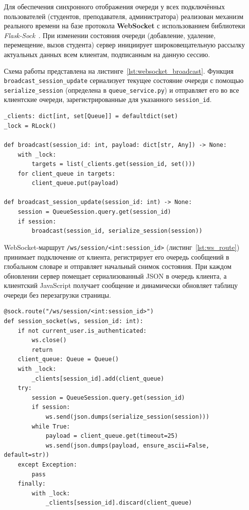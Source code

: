 Для обеспечения синхронного отображения очереди у всех подключённых пользователей (студентов, преподавателя, администратора) реализован механизм реального времени на базе протокола \textbf{WebSocket} с использованием библиотеки \textit{Flask-Sock}~\cite{flask_docs}. При изменении состояния очереди (добавление, удаление, перемещение, вызов студента) сервер инициирует широковещательную рассылку актуальных данных всем клиентам, подписанным на данную сессию.

Схема работы представлена на листинге~\ref{lst:websocket_broadcast}. Функция \texttt{broadcast\_session\_update} сериализует текущее состояние очереди с помощью \texttt{serialize\_session} (определена в \texttt{queue\_service.py}) и отправляет его во все клиентские очереди, зарегистрированные для указанного \texttt{session\_id}.

\begin{lstlisting}[caption={Широковещательная рассылка обновлений (realtime.py)}, label={lst:websocket_broadcast}]
_clients: dict[int, set[Queue]] = defaultdict(set)
_lock = RLock()

def broadcast(session_id: int, payload: dict[str, Any]) -> None:
    with _lock:
        targets = list(_clients.get(session_id, set()))
    for client_queue in targets:
        client_queue.put(payload)

def broadcast_session_update(session_id: int) -> None:
    session = QueueSession.query.get(session_id)
    if session:
        broadcast(session_id, serialize_session(session))
\end{lstlisting}

WebSocket-маршрут \texttt{/ws/session/<int:session\_id>} (листинг~\ref{lst:ws_route}) принимает подключение от клиента, регистрирует его очередь сообщений в глобальном словаре и отправляет начальный снимок состояния. При каждом обновлении сервер помещает сериализованный JSON в очередь клиента, а клиентский JavaScript получает сообщение и динамически обновляет таблицу очереди без перезагрузки страницы.

\begin{lstlisting}[caption={Обработчик WebSocket-соединения (realtime.py)}, label={lst:ws_route}]
@sock.route("/ws/session/<int:session_id>")
def session_socket(ws, session_id: int):
    if not current_user.is_authenticated:
        ws.close()
        return
    client_queue: Queue = Queue()
    with _lock:
        _clients[session_id].add(client_queue)
    try:
        session = QueueSession.query.get(session_id)
        if session:
            ws.send(json.dumps(serialize_session(session)))
        while True:
            payload = client_queue.get(timeout=25)
            ws.send(json.dumps(payload, ensure_ascii=False, default=str))
    except Exception:
        pass
    finally:
        with _lock:
            _clients[session_id].discard(client_queue)
\end{lstlisting}

